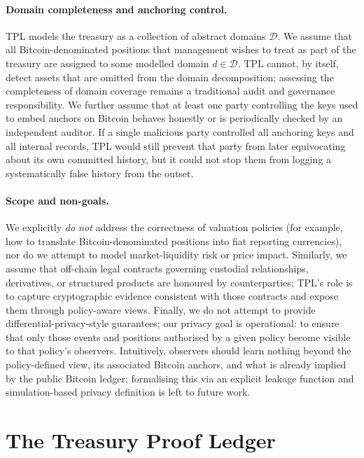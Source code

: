 \documentclass[11pt]{article}
\begin{document}
\paragraph{Domain completeness and anchoring control.}
TPL models the treasury as a collection of abstract domains $\mathcal{D}$.
We assume that all Bitcoin-denominated positions that management wishes to treat
as part of the treasury are assigned to some modelled domain $d \in \mathcal{D}$.
TPL cannot, by itself, detect assets that are omitted from the domain decomposition;
assessing the completeness of domain coverage remains a traditional audit and
governance responsibility.
We further assume that at least one party controlling the keys used to embed
anchors on Bitcoin behaves honestly or is periodically checked by an independent
auditor.
If a single malicious party controlled all anchoring keys and all internal records,
TPL would still prevent that party from later equivocating about its own committed
history, but it could not stop them from logging a systematically false history
from the outset.

\paragraph{Scope and non-goals.}
We explicitly \emph{do not} address the correctness of valuation policies (for example, how to translate Bitcoin-denominated positions into fiat reporting currencies), nor do we attempt to model market-liquidity risk or price impact.
Similarly, we assume that off-chain legal contracts governing custodial relationships, derivatives, or structured products are honoured by counterparties; TPL's role is to capture cryptographic evidence consistent with those contracts and expose them through policy-aware views.
Finally, we do not attempt to provide differential-privacy-style guarantees; our privacy goal is operational: to ensure that only those events and positions authorised by a given policy become visible to that policy's observers. Intuitively, observers should learn nothing beyond the policy-defined view, its associated Bitcoin anchors, and what is already implied by the public Bitcoin ledger; formalising this via an explicit leakage function and simulation-based privacy definition is left to future work.
\section{The Treasury Proof Ledger}
\label{sec:tpl}
\end{document}
